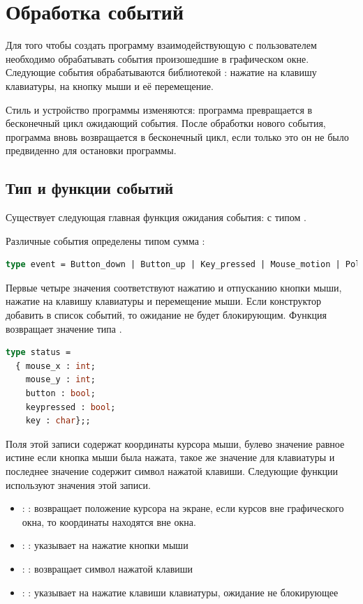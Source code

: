 \section{Обработка событий}
\label{sec:events}

Для того чтобы создать программу взаимодействующую с пользователем необходимо 
обрабатывать события произошедшие в графическом окне. Следующие события 
обрабатываются библиотекой : нажатие на клавишу клавиатуры, на 
кнопку мыши и её перемещение.

Стиль и устройство программы изменяются: программа превращается в бесконечный 
цикл ожидающий события. После обработки нового события, программа вновь 
возвращается в бесконечный цикл, если только это он не было предвиденно для 
остановки программы.

\subsection{Тип и функции событий}
\label{subsec:types_and_functions_for_events}

Существует следующая главная функция ожидания события:  
с типом .

Различные события определены типом сумма :

\begin{lstlisting}[language=OCaml]
type event = Button_down | Button_up | Key_pressed | Mouse_motion | Poll ;;
\end{lstlisting}

Первые четыре значения соответствуют нажатию и отпусканию кнопки мыши, нажатие 
на клавишу клавиатуры и перемещение мыши. Если конструктор  добавить 
в список событий, то ожидание не будет блокирующим. Функция возвращает значение 
типа .

\begin{lstlisting}[language=OCaml]
type status = 
  { mouse_x : int;
    mouse_y : int;
    button : bool;
    keypressed : bool;
    key : char};;
\end{lstlisting}

Поля этой записи содержат координаты курсора мыши, булево значение равное истине 
если кнопка мыши была нажата, такое же значение для клавиатуры и последнее 
значение содержит символ нажатой клавиши. Следующие функции используют значения 
этой записи.

\begin{itemize}
	\item {} :  : возвращает положение 
курсора на экране, если курсов вне графического окна, то координаты находятся 
вне окна.
	\item {} :  : указывает на нажатие 
кнопки мыши 
	\item {} :  : возвращает символ нажатой 
клавиши
	\item {} :  : указывает на нажатие 
клавиши клавиатуры, ожидание не блокирующее 
\end{itemize}

